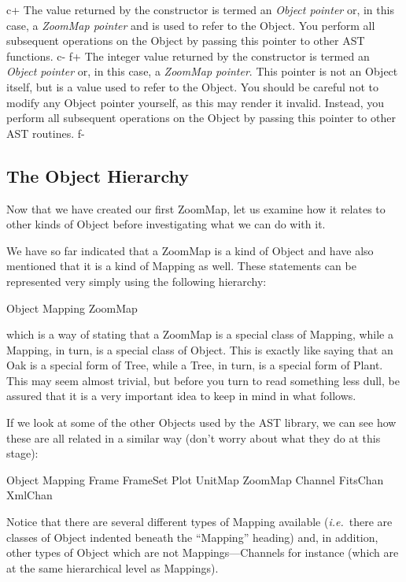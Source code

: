 \documentclass[twoside,11pt]{starlink}
\begin{document}
c+
The value returned by the constructor is termed an \emph{Object pointer}
or, in this case, a \emph{ZoomMap pointer} and is used to refer to the
Object.  You perform all subsequent operations on the Object by
passing this pointer to other AST functions.
c-
f+
The integer value returned by the constructor is termed an \emph{Object
pointer} or, in this case, a \emph{ZoomMap pointer}. This pointer is not
an Object itself, but is a value used to refer to the Object. You
should be careful not to modify any Object pointer yourself, as this
may render it invalid. Instead, you perform all subsequent operations
on the Object by passing this pointer to other AST routines.
f-

\subsection{\label{ss:objecthierarchy}The Object Hierarchy}

Now that we have created our first ZoomMap, let us examine how it
relates to other kinds of Object before investigating what we can do
with it.

We have so far indicated that a ZoomMap is a kind of Object and have
also mentioned that it is a kind of Mapping as well. These statements
can be represented very simply using the following hierarchy:

\small
\begin{terminalv}
Object
   Mapping
      ZoomMap
\end{terminalv}
\normalsize

which is a way of stating that a ZoomMap is a special class of
Mapping, while a Mapping, in turn, is a special class of Object.  This
is exactly like saying that an Oak is a special form of Tree, while a
Tree, in turn, is a special form of Plant. This may seem almost
trivial, but before you turn to read something less dull, be assured
that it is a very important idea to keep in mind in what follows.

If we look at some of the other Objects used by the AST library, we
can see how these are all related in a similar way (don't worry about
what they do at this stage):
\label{ss:mappinghierarchy}

\small
\begin{terminalv}
Object
   Mapping
      Frame
         FrameSet
            Plot
      UnitMap
      ZoomMap
   Channel
      FitsChan
      XmlChan
\end{terminalv}
\normalsize

Notice that there are several different types of Mapping available
(\emph{i.e.}\ there are classes of Object indented beneath the
``Mapping'' heading) and, in addition, other types of Object which are
not Mappings---Channels for instance (which are at the same
hierarchical level as Mappings).
\end{document}
